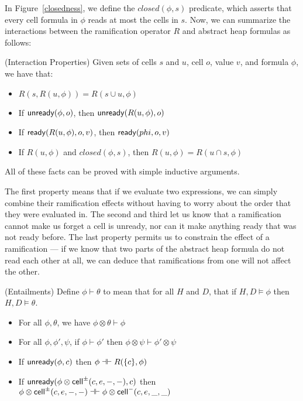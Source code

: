 In Figure~\ref{closedness}, we define the $\mathit{closed}(\phi, s)$ predicate,
which asserts that every cell formula in $\phi$ reads at most the
cells in $s$. Now, we can summarize the interactions between the 
ramification operator $R$ and abstract heap formulas as follows: 

\begin{prop}{(Interaction Properties)}
Given sets of cells $s$ and $u$, cell $o$, value $v$, and formula $\phi$, we have
that:
\begin{itemize}
\item $R(s, R(u, \phi)) = R(s \cup u, \phi)$
\item If $\mathsf{unready}({\phi}, {o})$, then $\mathsf{unready}({R(u, \phi)}, {o})$ 
\item If $\mathsf{ready}({R(u, \phi)}, {o}, {v})$, then $\mathsf{ready}({phi}, {o}, {v})$ 
\item If $R(u, \phi)$ and $\mathit{closed}(\phi, s)$, then $R(u, \phi) = R(u \cap s, \phi)$ 
\end{itemize}
\end{prop}

All of these facts can be proved with simple inductive arguments. 

The first property means that if we evaluate two expressions, we can
simply combine their ramification effects without having to worry
about the order that they were evaluated in. The second and third let
us know that a ramification cannot make us forget a cell is unready,
nor can it make anything ready that was not ready before. The last
property permits us to constrain the effect of a ramification --- if we
know that two parts of the abstract heap formula do not read each
other at all, we can deduce that ramifications from one will not
affect the other.

\begin{prop}{(Entailments)}
Define $\phi \vdash \theta$ to mean that for all $H$ and $D$, that if $H, D \models \phi$ then 
$H, D \models \theta$. 

\begin{itemize}
\item For all $\phi, \theta$, we have $\phi \otimes \theta \vdash \phi$
\item For all $\phi, \phi', \psi$, if $\phi \vdash \phi'$ then $\phi \otimes \psi \vdash \phi' \otimes \psi$  
\item If $\mathsf{unready}({\phi}, {c})$ then $\phi \dashv\vdash R(\{{c}\}, \phi)$
\item If $\mathsf{unready}({\phi \otimes \mathsf{cell}^{\pm}({c}, {e}, {-}, {-})}, {c})$ then $\phi \otimes \mathsf{cell}^{\pm}({c}, {e}, {-}, {-}) \dashv\vdash \phi \otimes \mathsf{cell}^{-}({c}, {e}, {\_}, {\_})$
\end{itemize}
\end{prop}

